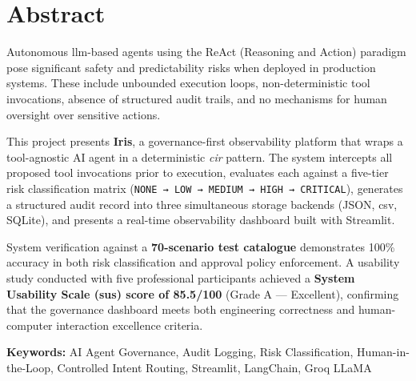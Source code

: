 \chapter*{Abstract}

Autonomous \gls{llm}-based agents using the ReAct (Reasoning and Action) paradigm pose significant safety and predictability risks when deployed in production systems. These include unbounded execution loops, non-deterministic tool invocations, absence of structured audit trails, and no mechanisms for human oversight over sensitive actions.

This project presents \textbf{Iris}, a governance-first observability platform that wraps a tool-agnostic AI agent in a deterministic \textit{\gls{cir}} pattern. The system intercepts all proposed tool invocations prior to execution, evaluates each against a five-tier risk classification matrix (\texttt{NONE → LOW → MEDIUM → HIGH → CRITICAL}), generates a structured audit record into three simultaneous storage backends (JSON, \gls{csv}, SQLite), and presents a real-time observability dashboard built with Streamlit.

System verification against a \textbf{70-scenario test catalogue} demonstrates 100\% accuracy in both risk classification and approval policy enforcement. A usability study conducted with five professional participants achieved a \textbf{System Usability Scale (\gls{sus}) score of 85.5/100} (Grade A — Excellent), confirming that the governance dashboard meets both engineering correctness and human-computer interaction excellence criteria.

\vspace{0.5cm}
\noindent\textbf{Keywords:} AI Agent Governance, Audit Logging, Risk Classification, Human-in-the-Loop, Controlled Intent Routing, Streamlit, LangChain, Groq LLaMA
